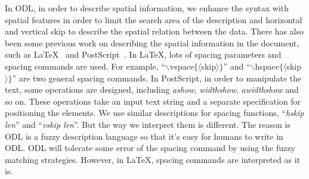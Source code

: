 In ODL, in order to describe spatial information,
we enhance the syntax with spatial features in order to limit the
search area of the description and horizontal and vertical
skip to describe the spatial relation between the data.
There has also been some
previous work on describing the spatial information in the document,
such as LaTeX~\cite{lamport1986document} and
PostScript~\cite{taft1999post}.
In LaTeX,
lots of spacing parameters and spacing commands are used.
For example, ``$\backslash$vspace$\lbrace\langle$skip$\rangle\rbrace$'' and
``$\backslash$hspace$\lbrace\langle$skip$\rangle\rbrace$''
are two general spacing commands.
In PostScript, in order to manipulate the text, some
operations are designed, including \textit{ashow}, \textit{widthshow},
\textit{awidthshow} and so on. These operations take an input text
string and a separate specification for positioning the elements.
We use similar descriptions for spacing functions,
``\textit{hskip len}'' and ``\textit{vskip len}''.
But the way we interpret them is different.
The reason is ODL is a fuzzy description language so that it's easy for
humans to write in ODL. ODL will tolerate some error of the spacing
command by using the fuzzy matching strategies.
However, in LaTeX, spacing commands are interpreted as it is.


